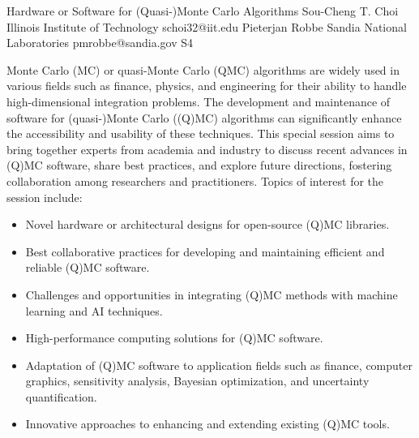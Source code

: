 \begin{session}
 {Hardware or Software for (Quasi-)Monte Carlo Algorithms}%
 {Sou-Cheng T.  Choi}%
 {Illinois Institute of Technology}%
 {schoi32@iit.edu}%
 {Pieterjan Robbe}%
 {Sandia National Laboratories}%
 {pmrobbe@sandia.gov}%
 {S4}%
 {}%

 Monte Carlo (MC) or quasi-Monte Carlo (QMC) algorithms are widely used in various fields such as finance, physics, and engineering for their ability to handle high-dimensional integration problems. The development and maintenance of software for (quasi-)Monte Carlo ((Q)MC) algorithms can significantly enhance the accessibility and usability of these techniques. This special session aims to bring together experts from academia and industry to discuss recent advances in (Q)MC software, share best practices, and explore future directions, fostering collaboration among researchers and practitioners.
 Topics of interest for the session include:
 \begin{itemize}
 \item Novel hardware or architectural designs for open-source (Q)MC libraries.
 \item Best collaborative practices for developing and maintaining efficient and reliable (Q)MC software.
 \item Challenges and opportunities in integrating (Q)MC methods with machine learning and AI techniques.
 \item High-performance computing solutions for (Q)MC software.
 \item Adaptation of (Q)MC software to application fields such as finance, computer graphics, sensitivity analysis, Bayesian optimization, and uncertainty quantification.
 \item Innovative approaches to enhancing and extending existing (Q)MC tools.
 \end{itemize}
\end{session}



\clearpage

